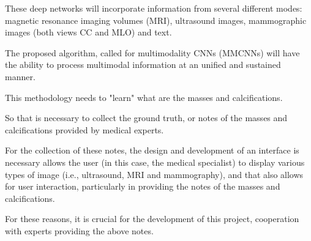 These deep networks will incorporate information from several different modes: magnetic resonance imaging volumes (MRI), ultrasound images, mammographic images (both views CC and MLO) and text.

The proposed algorithm, called for multimodality CNNs (MMCNNs) will have the ability to process multimodal information at an unified and sustained manner.

This methodology needs to "learn" what are the masses and calcifications.

So that is necessary to collect the ground truth, or notes of the masses and calcifications provided by medical experts.

\break

For the collection of these notes, the design and development of an interface is necessary allows the user (in this case, the medical specialist) to display various types of image (i.e., ultrasound, MRI and mammography), and that also allows for user interaction, particularly in providing the notes of the masses and calcifications.

For these reasons, it is crucial for the development of this project, cooperation with experts providing the above notes.